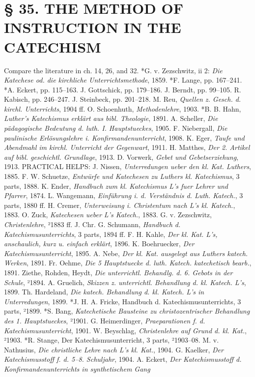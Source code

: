 \chapter[§ 35. THE METHOD IN THE CATECHISM]{§ 35. THE METHOD OF INSTRUCTION IN THE CATECHISM}

Compare the literature in ch. 14, 26, and 32. *G. v. Zezschwitz, ii 2: \emph{Die Katechese od. die kirchliche Unterrichtsmethode}, 1859. *F. Lange, pp. 167–241. *A. Eckert, pp. 115–163. J. Gottschick, pp. 179–186. J. Berndt, pp. 99–105. R. Kabisch, pp. 246–247. J. Steinbeck, pp. 201–218. M. Reu, \emph{Quellen z. Gesch. d. kirchl. Unterrichts}, 1904 ff. O. Schoenhuth, \emph{Methodenlehre}, 1903. *B. B. Hahn, \emph{Luther's Katechismus erklärt aus bibl. Theologie}, 1891. A. Scheller, \emph{Die pädagogische Bedeutung d. luth. I. Hauptstueckes}, 1905. F. Niebergall, \emph{Die paulinische Erlösungslehre i. Konfirmandenunterricht}, 1908. K. Eger, \emph{Taufe und Abendmahl im kirchl. Unterricht der Gegenwart}, 1911. H. Matthes, \emph{Der 2. Artikel auf bibl. geschichtl. Grundlage}, 1913. D. Vorwerk, \emph{Gebet und Gebetserziehung}, 1913. PRACTICAL HELPS: J. Nissen, \emph{Unterredungen ueber den kl. Kat. Luthers}, 1885. F. W. Schuetze, \emph{Entwürfe und Katechesen zu Luthers kl. Katechismus}, 3 parts, 1888. K. Ender, \emph{Handbuch zum kl. Katechismus L's fuer Lehrer und Pfarrer}, 1874. L. Wangemann, \emph{Einführung i. d. Verständnis d. Luth. Katech.}, 3 parts, 1880 ff. H. Cremer, \emph{Unterweisung i. Christentum nach L's kl. Katech.}, 1883. O. Zuck, \emph{Katechesen ueber L's Katech.}, 1883. G. v. Zezschwitz, \emph{Christenlehre}, ²1883 ff. J. Chr. G. Schumann, \emph{Handbuch d. Katechismusunterrichts}, 3 parts, 1894 ff. F. H. Kahle, \emph{Der kl. Kat. L's, anschaulich, kurz u. einfach erklärt}, 1896. K. Boehruecker, \emph{Der Katechismusunterricht}, 1895. A. Nebe, \emph{Der kl. Kat. ausgelegt aus Luthers katech. Werken}, 1891. Fr. Oehme, \emph{Die 5 Hauptstuecke d. luth. Katech. katechetisch bearb.}, 1891. Ziethe, Rohden, Heydt, \emph{Die unterrichtl. Behandlg. d. 6. Gebots in der Schule}, ²1894. A. Gruelich, \emph{Skizzen z. unterrichtl. Behandlung d. kl. Katech. L's}, 1899. Th. Hardeland, \emph{Die katech. Behandlung d. kl. Katech. L's in Unterredungen}, 1899. *J. H. A. Fricke, Handbuch d. Katechismusunterrichts, 3 parts, ²1899. *S. Bang, \emph{Katechetische Bausteine zu christozentrischer Behandlung des 1. Hauptstueckes}, ²1901. G. Heimerdinger, \emph{Praeparationen f. d. Katechismusunterricht}, 1901. W. Beyschlag, \emph{Christenlehre auf Grund d. kl. Kat.}, ²1903. *R. Stange, Der Katechismusunterricht, 3 parts, ²1903–08. M. v. Nathusius, \emph{Die christliche Lehre nach L's kl. Kat.}, 1904. G. Kaelker, \emph{Der Katechismusstoff f. d. 5–8. Schuljahr}, 1904. A. Eckert, \emph{Der Katechismusstoff d. Konfirmandenunterrichts in synthetischem Gang}
